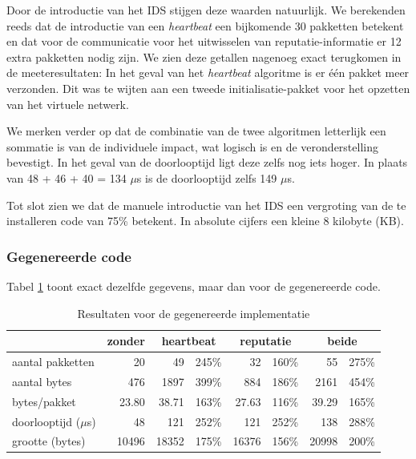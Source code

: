 Door de introductie van het IDS stijgen deze waarden natuurlijk. We berekenden
reeds dat de introductie van een \emph{heartbeat} een bijkomende 30 pakketten
betekent en dat voor de communicatie voor het uitwisselen van
reputatie-informatie er 12 extra pakketten nodig zijn. We zien deze getallen
nagenoeg exact terugkomen in de meeteresultaten: In het geval van het
\emph{heartbeat} algoritme is er \'e\'en pakket meer verzonden. Dit was te
wijten aan een tweede initialisatie-pakket voor het opzetten van het virtuele
netwerk.

We merken verder op dat de combinatie van de twee algoritmen letterlijk een
sommatie is van de individuele impact, wat logisch is en de veronderstelling
bevestigt. In het geval van de doorlooptijd ligt deze zelfs nog iets hoger. In
plaats van 48 + 46 + 40 = 134 $\mu$s is de doorlooptijd zelfs 149 $\mu$s.

Tot slot zien we dat de manuele introductie van het IDS een vergroting van de
te installeren code van 75\% betekent. In absolute cijfers een kleine 8
kilobyte (KB).

\vspace{-3mm}

\subsubsection{Gegenereerde code}

Tabel \ref{tbl:generated} toont exact dezelfde gegevens, maar dan voor de
gegenereerde code.

\begin{table}[H]
  \centering
  \begin{tabular}{l|r|rr|rr|rr}
  \hline
      & zonder & \multicolumn{2}{c|}{heartbeat} & \multicolumn{2}{c|}{reputatie} & \multicolumn{2}{c}{beide} \\
  \hline
  \hline
  
aantal pakketten      &    20	   &    49	  & 245\%	&    32	   & 160\% &    55	  & 275\% \\
aantal bytes          &   476	   &  1897	  & 399\%	&   884	   & 186\% &  2161	  & 454\% \\
bytes/pakket          &    23.80 &  	38.71	& 163\%	&    27.63 & 116\% &    39.29	& 165\% \\
doorlooptijd ($\mu$s) &    48    &   121	  & 252\%	&   121	   & 252\% &   138	  & 288\% \\
grootte (bytes)       &	10496	   & 18352	  & 175\%	& 16376	   & 156\% & 20998	  & 200\% \\

  \hline
  \end{tabular}
  \caption{Resultaten voor de gegenereerde implementatie}
  \label{tbl:generated}
\end{table}

